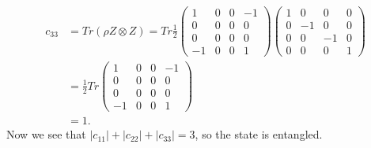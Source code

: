 \documentclass[10pt]{article}
\begin{document}
\begin{align*}
c_{33} &= Tr(\rho Z \otimes Z) = 
Tr \frac{1}{2} 
\begin{pmatrix}
1 & 0 & 0 & -1 \\
0 & 0 & 0 & 0 \\
0 & 0 & 0 & 0 \\
-1 & 0 & 0 & 1 
\end{pmatrix}
\begin{pmatrix}
1 & 0 & 0 & 0 \\
0 & -1 & 0 & 0 \\
0 & 0 & -1 & 0 \\
0 & 0 & 0 & 1 
\end{pmatrix} \\
&=
\frac{1}{2} Tr
\begin{pmatrix}
1 & 0 & 0 & -1 \\
0 & 0 & 0 & 0 \\
0 & 0 & 0 & 0 \\
-1 & 0 & 0 & 1 
\end{pmatrix} \\
&= 1.
\end{align*}
Now we see that $|c_{11}| + |c_{22}| + |c_{33}| = 3$, so the state is entangled.
\end{document}

